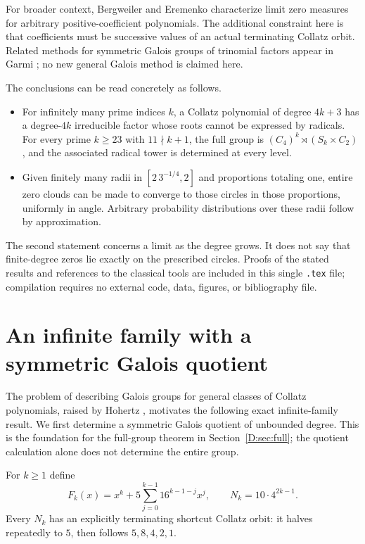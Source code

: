 \documentclass[11pt,a4paper]{article}
\theoremstyle{definition}
\theoremstyle{remark}
\numberwithin{equation}{section}
\begin{document}
For broader context, Bergweiler and Eremenko \cite{R098} characterize
limit zero measures for arbitrary positive-coefficient polynomials. The
additional constraint here is that coefficients must be successive values
of an actual terminating Collatz orbit. Related methods for symmetric
Galois groups of trinomial factors appear in Garmi \cite{R099}; no
new general Galois method is claimed here.

The conclusions can be read concretely as follows.
\begin{itemize}
\item For infinitely many prime indices $k$, a Collatz polynomial of degree
$4k+3$ has a degree-$4k$ irreducible factor whose roots cannot be expressed
by radicals. For every prime $k\ge23$ with $11\nmid k+1$, the full group is
$(C_4)^k\rtimes(S_k\times C_2)$, and the associated radical tower is
determined at every level.
\item Given finitely many radii in $[2\,3^{-1/4},2]$ and proportions totaling
one, entire zero clouds can be made to converge to those circles in those
proportions, uniformly in angle. Arbitrary probability distributions over
these radii follow by approximation.
\end{itemize}
The second statement concerns a limit as the degree grows. It does not say
that finite-degree zeros lie exactly on the prescribed circles. Proofs of the stated results and references to the classical tools are included in this single
\texttt{.tex} file; compilation requires no external code, data, figures, or
bibliography file.

\section{An infinite family with a symmetric Galois quotient}
\label{D:sec:infinite-symmetric-quotient}

The problem of describing Galois groups for general classes of Collatz
polynomials, raised by Hohertz \cite[Section~5, question~6]{R005}, motivates the following exact infinite-family
result. We first determine a symmetric Galois quotient of unbounded degree.
This is the foundation for the full-group theorem in Section~\ref{D:sec:full};
the quotient calculation alone does not determine the entire group.

For $k\geq1$ define
\[
 F_k(x)=x^k+5\sum_{j=0}^{k-1}16^{k-1-j}x^j,
 \qquad N_k=10\cdot4^{2k-1}.
\]
Every $N_k$ has an explicitly terminating shortcut Collatz orbit: it halves
repeatedly to $5$, then follows $5,8,4,2,1$.
\end{document}
